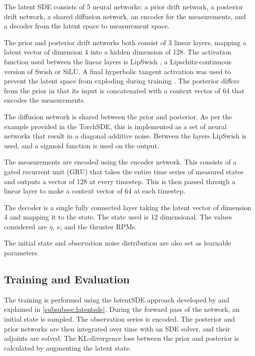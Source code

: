 The latent SDE consists of 5 neural networks: a prior drift network, a posterior drift network, a shared diffusion
network, an encoder for the measurements, and a decoder from the latent space to measurement space. 

The prior and posterior drift networks both consist of 3 linear layers, mapping a latent vector of dimension 4 into a
hidden dimension of 128. The activation function used between the linear layers is LipSwish
\parencite{kidgerNeuralDifferentialEquations2022}, a Lipschitz-continuous version of Swish or SiLU. A final hyperbolic
tangent activation was used to prevent the latent space from exploding during training
\parencite{kidgerNeuralSDEsInfiniteDimensional2021}. The posterior differs from the prior in that its input is
concatenated with a context vector of 64 that encodes the measurements.

The diffusion network is shared between the prior and posterior. As per the example provided in the TorchSDE, this is
implemented as a set of neural networks that result in a diagonal additive noise. Between the layers LipSwish is used, and a sigmoid function is used on the output.

The measurements are encoded using the encoder network. This consists of a gated recurrent unit (GRU) that takes the
entire time series of measured states and outputs a vector of 128 at every timestep. This is then passed through
a linear layer to make a context vector of 64 at each timestep.

The decoder is a single fully connected layer taking the latent vector of dimension 4 and mapping it to the state. The
state used is 12 dimensional. The values considered are \(\eta\), \(\nu\), and the thruster RPMs.

The initial state and observation noise distribution are also set as learnable parameters.

\subsection{Training and Evaluation}
\label{subsec:pilot_latentsde_training}
The training is performed using the latentSDE approach developed by \textcite{liScalableGradientsStochastic2020} and
explained in \cref{subsubsec:latentsde}. During the forward pass of the network, an initial state is sampled. The
observation series is encoded. The posterior and prior networks are then integrated over time with an SDE solver, and
their adjoints are solved. The KL-divergence loss between the prior and posterior is calculated by augmenting the latent
state.

